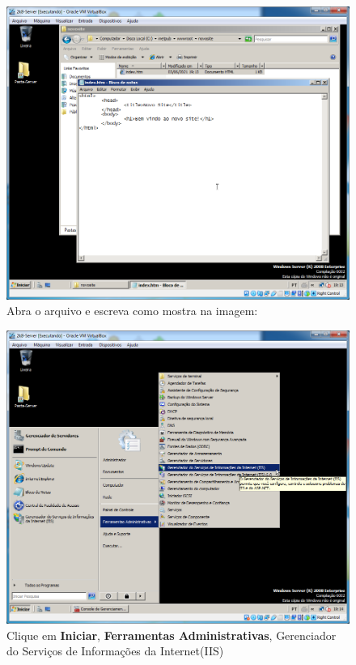 \documentclass[10pt]{article}
\begin{document}
\begin{figure}[H]
    \centering
    \caption{Abra o arquivo e escreva como mostra na imagem:}
    \label{fig:5532034}
    \includegraphics[width=\linewidth]{images/IIS/criando_um_novo_site/034.png}
\end{figure}
\begin{figure}[H]
    \centering
    \caption{Clique em \textbf{Iniciar}, \textbf{Ferramentas Administrativas}, Gerenciador do Serviços de Informações da Internet(IIS)}
    \label{fig:5532035}
    \includegraphics[width=\linewidth]{images/IIS/criando_um_novo_site/035.png}
\end{figure}
\end{document}
